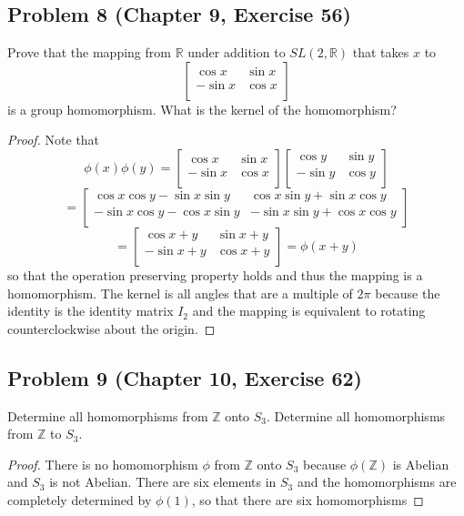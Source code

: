 \documentclass{article}
\begin{document}
\subsection*{Problem 8 (Chapter 9, Exercise 56)}
Prove that the mapping from $\mathbb{R}$ under addition to $SL(2, \mathbb{R})$ that takes $x$ to
\[ \begin{bmatrix}
\cos{x} & \sin{x} \\
-\sin{x} & \cos{x} \\
\end{bmatrix}\]
is a group homomorphism. What is the kernel of the homomorphism?
\begin{proof}
Note that
\[ \phi(x)\phi(y) = \begin{bmatrix}
\cos{x} & \sin{x} \\
-\sin{x} & \cos{x} \\
\end{bmatrix}\begin{bmatrix}
\cos{y} & \sin{y} \\
-\sin{y} & \cos{y} \\
\end{bmatrix}\]
\[ = \begin{bmatrix}
\cos{x}\cos{y} - \sin{x}\sin{y} & \cos{x}\sin{y} + \sin{x}\cos{y} \\
-\sin{x}\cos{y} - \cos{x}\sin{y} & -\sin{x}\sin{y} + \cos{x}\cos{y} \\
\end{bmatrix}\]
\[ = \begin{bmatrix}
\cos{x + y} & \sin{x + y} \\
-\sin{x + y} & \cos{x + y} \\
\end{bmatrix} = \phi(x + y)\]
so that the operation preserving property holds and thus the mapping is a homomorphism. The kernel is all angles that are a multiple of $2\pi$ because the identity is the identity matrix $I_2$ and the mapping is equivalent to rotating counterclockwise about the origin.
\end{proof}

\subsection*{Problem 9 (Chapter 10, Exercise 62)}
Determine all homomorphisms from $\mathbb{Z}$ onto $S_3$. Determine all homomorphisms from $\mathbb{Z}$ to $S_3$.
\begin{proof} 
There is no homomorphism $\phi$ from $\mathbb{Z}$ onto $S_3$ because $\phi(\mathbb{Z})$ is Abelian and $S_3$ is not Abelian. There are six elements in $S_3$ and the homomorphisms are completely determined by $\phi(1)$, so that there are six homomorphisms 
\end{proof}
\end{document}
